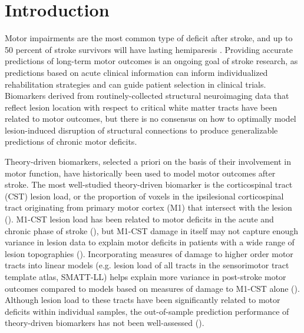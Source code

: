 \documentclass[10pt]{article}
\begin{document}
\section{Introduction}
Motor impairments are the most common type of deficit after stroke, and up to 50 percent of stroke survivors will have lasting hemiparesis \cite{Kelly-Hayes2003-sp}. Providing accurate predictions of long-term motor outcomes is an ongoing goal of stroke research, as predictions based on acute clinical information can inform individualized rehabilitation strategies and can guide patient selection in clinical trials\cite{Bonkhoff2022-op, Boyd2017-gs}. Biomarkers derived from routinely-collected structural neuroimaging data that reflect lesion location with respect to critical white matter tracts have been related to motor outcomes\cite{Tozlu2020-qa, Kuceyeski2016-vj, Griffis2019-cy, Salvalaggio2020-pe, Bowren2022-rs}, but there is no consensus on how to optimally model lesion-induced disruption of structural connections to produce generalizable predictions of chronic motor deficits. 

Theory-driven biomarkers, selected a priori on the basis of their involvement in motor function, have historically been used to model motor outcomes after stroke. The most well-studied theory-driven biomarker is the corticospinal tract (CST) lesion load, or the proportion of voxels in the ipsilesional corticospinal tract originating from primary motor cortex (M1) that intersect with the lesion (\cite{Zhu2010-qh, Feng2015-du, Findlater2019-je, Lam2018-xh, Pineiro2000-dv}). M1-CST lesion load  has been related to motor deficits in the acute and chronic phase of stroke (\cite{Boyd2017-gs, Kim2017-xe}), but M1-CST damage in itself may not capture enough variance in lesion data to explain motor deficits in patients with a wide range of lesion topographies (\cite{Park2016-te,Findlater2019-je, Paul2023-ce}). Incorporating measures of damage to higher order motor tracts into linear models (e.g. lesion load of all tracts in the sensorimotor tract template atlas, SMATT-LL) helps explain more variance in post-stroke motor outcomes compared to models based on measures of damage to M1-CST alone (\cite{Ito2022-em,  Rondina2016-ds, Rondina2017-ij, Schulz2012-yy, Park2016-te}). Although lesion load to these tracts have been significantly related to motor deficits within individual samples, the out-of-sample prediction performance of theory-driven biomarkers has not been well-assessed (\cite{Kim2017-xe}).
\end{document}
